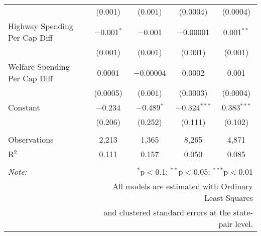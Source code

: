 \begin{table}[!htbp]
\begin{tabular}{@{\extracolsep{5pt}}lcccc}
  & (0.001) & (0.001) & (0.0004) & (0.0004) \\ 
  Highway Spending Per Cap Diff & $-$0.001$^{*}$ & $-$0.001 & $-$0.00001 & 0.001$^{**}$ \\ 
  & (0.001) & (0.001) & (0.001) & (0.001) \\ 
  Welfare Spending Per Cap Diff & 0.0001 & $-$0.00004 & 0.0002 & 0.001 \\ 
  & (0.0005) & (0.001) & (0.0003) & (0.0004) \\ 
  Constant & $-$0.234 & $-$0.489$^{*}$ & $-$0.324$^{***}$ & 0.383$^{***}$ \\ 
  & (0.206) & (0.252) & (0.111) & (0.102) \\ 
 \hline \\[-1.8ex] 
Observations & 2,213 & 1,365 & 8,265 & 4,871 \\ 
R$^{2}$ & 0.111 & 0.157 & 0.050 & 0.085 \\ 
\hline 
\hline \\[-1.8ex] 
\textit{Note:}  & \multicolumn{4}{r}{$^{*}$p$<$0.1; $^{**}$p$<$0.05; $^{***}$p$<$0.01} \\ 
 & \multicolumn{4}{r}{All models are estimated with Ordinary Least Squares} \\ 
 & \multicolumn{4}{r}{and clustered standard errors at the state-pair level.} \\ 
\end{tabular} 
\end{table} 
